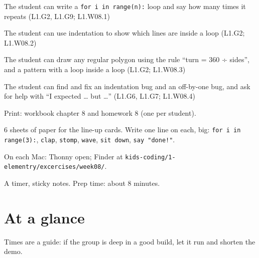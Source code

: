 
\begin{objectives}
  \item The student can write a \texttt{for i in range(n):} loop and say how many times it repeats (L1.G2, L1.G9; L1.W08.1)
  \item The student can use indentation to show which lines are inside a loop (L1.G2; L1.W08.2)
  \item The student can draw any regular polygon using the rule \enquote{turn = 360 ÷ sides}, and a pattern with a loop inside a loop (L1.G2; L1.W08.3)
  \item The student can find and fix an indentation bug and an off-by-one bug, and ask for help with \enquote{I expected … but …} (L1.G6, L1.G7; L1.W08.4)
\end{objectives}

\begin{materials}
  \item Print: workbook chapter 8 and homework 8 (one per student).
  \item 6 sheets of paper for the line-up cards. Write one line on each, big: \texttt{for i in range(3):}, \texttt{clap}, \texttt{stomp}, \texttt{wave}, \texttt{sit down}, \texttt{say "done!"}.
  \item On each Mac: Thonny open; Finder at \texttt{kids-coding/1-elementry/excercises/week08/}.
  \item A timer, sticky notes. Prep time: about 8 minutes.
\end{materials}

\section{At a glance}
Times are a guide: if the group is deep in a good build, let it run and shorten the demo.
\begin{timeplan}
\end{timeplan}

